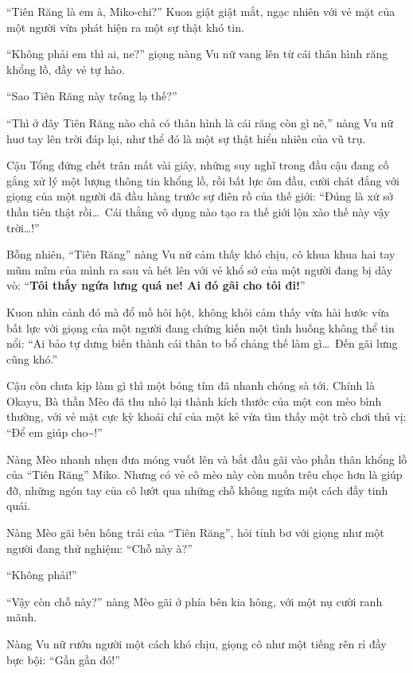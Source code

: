 \documentclass[../main.tex]{subfiles}
\begin{document}
``Tiên Răng là em à, Miko-chi?'' Kuon giật giật mắt, ngạc nhiên với vẻ mặt của một người vừa phát hiện ra một sự thật khó tin.

``Không phải em thì ai, ne?'' giọng nàng Vu nữ vang lên từ cái thân hình răng khổng lồ, đầy vẻ tự hào.

``Sao Tiên Răng này trông lạ thế?''

``Thì ở đây Tiên Răng nào chả có thân hình là cái răng còn gì nẽ,'' nàng Vu nữ huơ tay lên trời đáp lại, như thể đó là một sự thật hiển nhiên của vũ trụ.

Cậu Tổng đứng chết trân mất vài giây, những suy nghĩ trong đầu cậu đang cố gắng xử lý một lượng thông tin khổng lồ, rồi bất lực ôm đầu, cười chát đắng với giọng của một người đã đầu hàng trước sự điên rồ của thế giới: ``Đúng là xứ sở thần tiên thật rồi\dots\ Cái thằng vô dụng nào tạo ra thế giới lộn xào thế này vậy trời\dots!''

Bỗng nhiên, ``Tiên Răng'' nàng Vu nữ cảm thấy khó chịu, cô khua khua hai tay mũm mĩm của mình ra sau và hét lên với vẻ khổ sở của một người đang bị dày vò: ``\textbf{Tôi thấy ngứa lưng quá ne! Ai đó gãi cho tôi đi!}''

Kuon nhìn cảnh đó mà đổ mồ hôi hột, không khỏi cảm thấy vừa hài hước vừa bất lực với giọng của một người đang chứng kiến một tình huống không thể tin nổi: ``Ai bảo tự dưng biến thành cái thân to bổ chảng thế làm gì\dots\ Đến gãi lưng cũng khó.''

Cậu còn chưa kịp làm gì thì một bóng tím đã nhanh chóng sà tới. Chính là Okayu, Bà thần Mèo đã thu nhỏ lại thành kích thước của một con mèo bình thường, với vẻ mặt cực kỳ khoái chí của một kẻ vừa tìm thấy một trò chơi thú vị: ``Để em giúp cho\~{}!''

Nàng Mèo nhanh nhẹn đưa móng vuốt lên và bắt đầu gãi vào phần thân khổng lồ của ``Tiên Răng'' Miko. Nhưng có vẻ cô mèo này còn muốn trêu chọc hơn là giúp đỡ, những ngón tay của cô lướt qua những chỗ không ngứa một cách đầy tinh quái.


Nàng Mèo gãi bên hông trái của ``Tiên Răng'', hỏi tỉnh bơ với giọng như một người đang thử nghiệm: ``Chỗ này à?''

``Không phải!''

``Vậy còn chỗ này?'' nàng Mèo gãi ở phía bên kia hông, với một nụ cười ranh mãnh.

Nàng Vu nữ rướn người một cách khó chịu, giọng cô như một tiếng rên rỉ đầy bực bội: ``Gần gần đó!''
\end{document}
